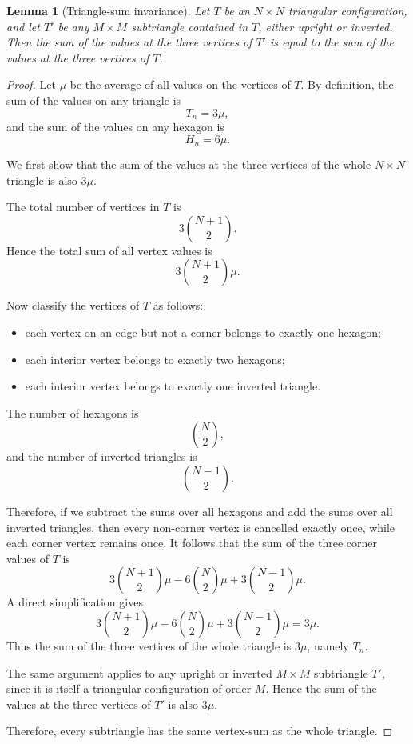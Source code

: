 \documentclass[11pt]{article}
\theoremstyle{plain}
\newtheorem{lemma}[theorem]{Lemma}
\theoremstyle{definition}
\begin{document}
\begin{lemma}[Triangle-sum invariance]\label{lem:triangle-sum-invariance}
Let $T$ be an $N \times N$ triangular configuration, and let $T'$ be any $M \times M$ subtriangle contained in $T$, either upright or inverted. Then the sum of the values at the three vertices of $T'$ is equal to the sum of the values at the three vertices of $T$.
\end{lemma}

\begin{proof}
Let $\mu$ be the average of all values on the vertices of $T$.
By definition, the sum of the values on any triangle is
\[
T_n = 3\mu,
\]
and the sum of the values on any hexagon is
\[
H_n = 6\mu.
\]

We first show that the sum of the values at the three vertices of the whole $N\times N$ triangle is also $3\mu$.

The total number of vertices in $T$ is
\[
3\binom{N+1}{2}.
\]
Hence the total sum of all vertex values is
\[
3\binom{N+1}{2}\mu.
\]

Now classify the vertices of $T$ as follows:
\begin{itemize}
    \item each vertex on an edge but not a corner belongs to exactly one hexagon;
    \item each interior vertex belongs to exactly two hexagons;
    \item each interior vertex belongs to exactly one inverted triangle.
\end{itemize}

The number of hexagons is
\[
\binom{N}{2},
\]
and the number of inverted triangles is
\[
\binom{N-1}{2}.
\]

Therefore, if we subtract the sums over all hexagons and add the sums over all inverted triangles, then every non-corner vertex is cancelled exactly once, while each corner vertex remains once. It follows that the sum of the three corner values of $T$ is
\[
3\binom{N+1}{2}\mu
-6\binom{N}{2}\mu
+3\binom{N-1}{2}\mu.
\]
A direct simplification gives
\[
3\binom{N+1}{2}\mu
-6\binom{N}{2}\mu
+3\binom{N-1}{2}\mu
=3\mu.
\]
Thus the sum of the three vertices of the whole triangle is $3\mu$, namely $T_n$.

The same argument applies to any upright or inverted $M\times M$ subtriangle $T'$, since it is itself a triangular configuration of order $M$. Hence the sum of the values at the three vertices of $T'$ is also $3\mu$.

Therefore, every subtriangle has the same vertex-sum as the whole triangle.
\end{proof}
\end{document}
